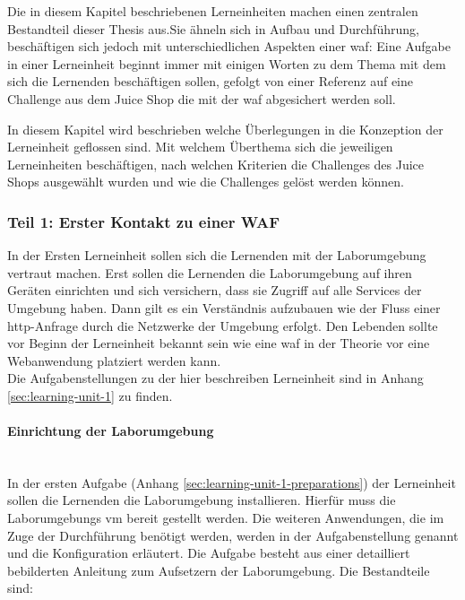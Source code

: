 Die in diesem Kapitel beschriebenen Lerneinheiten machen einen zentralen Bestandteil dieser Thesis aus.Sie ähneln sich in Aufbau und Durchführung, beschäftigen sich jedoch mit unterschiedlichen Aspekten einer \ac{waf}:
Eine Aufgabe in einer Lerneinheit beginnt immer mit einigen Worten zu dem Thema mit dem sich die Lernenden beschäftigen sollen, gefolgt von einer Referenz auf eine Challenge aus dem Juice Shop die mit der \ac{waf} abgesichert werden soll.

In diesem Kapitel wird beschrieben welche Überlegungen in die Konzeption der Lerneinheit geflossen sind.
Mit welchem Überthema sich die jeweiligen Lerneinheiten beschäftigen, nach welchen Kriterien die Challenges des Juice Shops ausgewählt wurden und wie die Challenges gelöst werden können.

\subsubsection{Teil 1: Erster Kontakt zu einer WAF}
\label{sec:learning-unit-1-meta}

In der Ersten Lerneinheit sollen sich die Lernenden mit der Laborumgebung vertraut machen.
Erst sollen die Lernenden die Laborumgebung auf ihren Geräten einrichten und sich versichern, dass sie Zugriff auf alle Services der Umgebung haben.
Dann gilt es ein Verständnis aufzubauen wie der Fluss einer \ac{http}-Anfrage durch die Netzwerke der Umgebung erfolgt.
Den Lebenden sollte vor Beginn der Lerneinheit bekannt sein wie eine \ac{waf} in der Theorie vor eine Webanwendung platziert werden kann.\\

Die Aufgabenstellungen zu der hier beschreiben Lerneinheit sind in Anhang \ref{sec:learning-unit-1} zu finden.\\

\paragraph{Einrichtung der Laborumgebung}\ \\

In der ersten Aufgabe (Anhang \ref{sec:learning-unit-1-preparations}) der Lerneinheit sollen die Lernenden die Laborumgebung installieren.
Hierfür muss die Laborumgebungs \ac{vm} bereit gestellt werden.
Die weiteren Anwendungen, die im Zuge der Durchführung benötigt werden, werden in der Aufgabenstellung genannt und die Konfiguration erläutert.
Die Aufgabe besteht aus einer detailliert bebilderten Anleitung zum Aufsetzern der Laborumgebung.
Die Bestandteile sind:


